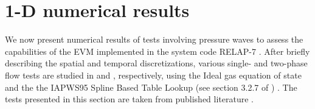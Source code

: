 \documentclass{inputs/mc2015}
\begin{document}
\section{1-D numerical results}\label{sec:results}
%
%
We now present numerical results of tests involving pressure waves to assess the capabilities of the EVM implemented in the system code RELAP-7 \cite{Berry_Peterson_2014}.   After briefly describing the spatial and temporal discretizations, various single- and two-phase flow tests are studied in  and , respectively, using the Ideal gas equation of state and the the IAPWS95 Spline Based Table Lookup (see section 3.2.7 of \cite{Berry_Peterson_2014})  . The tests presented in this section are taken from published literature \cite{Sokolowski-Koszela, Serre-bestion}.
%
%
\end{document}
